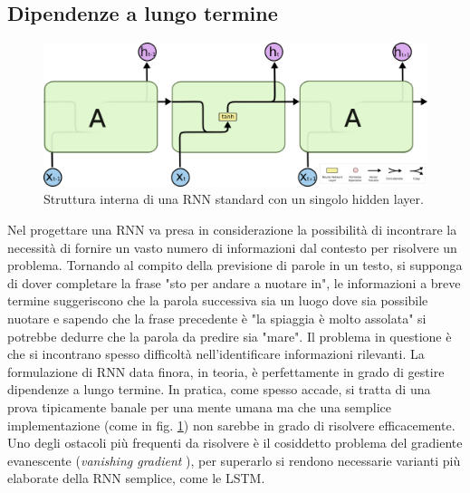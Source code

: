 \subsection{Dipendenze a lungo termine} %
\label{sub:dipendenze_a_lungo_termine}
\begin{figure}[ht]
	\centering
	\includegraphics{img/rnn_struct.png}
	\caption{Struttura interna di una RNN standard con un singolo hidden layer.}
	\label{fig:1.8}
\end{figure}
Nel progettare una RNN va presa in considerazione la possibilità di incontrare la necessità di fornire un vasto numero di informazioni dal contesto per risolvere un problema. Tornando al compito della previsione di parole in un testo, si supponga di dover completare la frase "sto per andare a nuotare in", le informazioni a breve termine suggeriscono che la parola successiva sia un luogo dove sia possibile nuotare e sapendo che la frase precedente è "la spiaggia è molto assolata" si potrebbe dedurre che la parola da predire sia "mare". Il problema in questione è che si incontrano spesso difficoltà nell'identificare informazioni rilevanti. La formulazione di RNN data finora, in teoria, è perfettamente in grado di gestire dipendenze a lungo termine. In pratica, come spesso accade, si tratta di una prova tipicamente banale per una mente umana ma che una semplice implementazione (come in fig. \ref{fig:1.8}) non sarebbe in grado di risolvere efficacemente. Uno degli ostacoli più frequenti da risolvere è il cosiddetto problema del gradiente evanescente (\textit{vanishing gradient} \cite{vanishing}), per superarlo si rendono necessarie varianti più elaborate della RNN semplice, come le LSTM.
